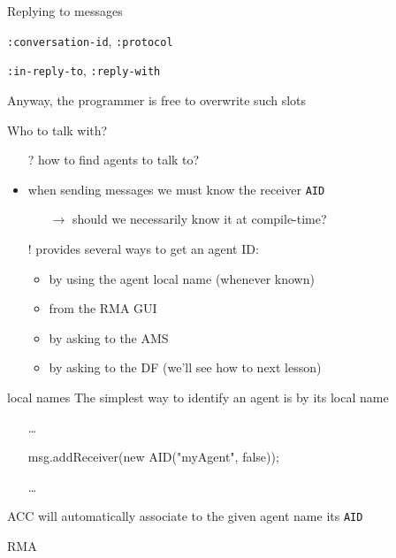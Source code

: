 \documentclass{beamer}\mode<presentation>{\usetheme{AMSCesenaPurpleAndGold}}
\begin{document}
\begin{frame}[c,allowframebreaks]
\begin{block}{Replying to messages}
\begin{itemize}
\begin{small}
                \item \texttt{:conversation-id}, \texttt{:protocol}
                \item \texttt{:in-reply-to}, \texttt{:reply-with}
        \end{small}\end{itemize}
        Anyway, the programmer is free to overwrite such slots
    \end{block}
    \begin{block}{Who to talk with?}
        \begin{itemize}
            \item[?] how to find agents to talk to?
            \item when sending messages we must know the receiver \texttt{AID}
            \begin{itemize}
                \item[$\rightarrow$] should we necessarily know it at compile-time?
            \end{itemize}
            \item[!] \jade{} provides several ways to get an agent ID:
            \begin{itemize}
                \item by using the agent \alert{local name} (whenever known)
                \item from the RMA GUI
                \item by asking to the AMS
                \item by asking to the DF (we'll see how to next lesson)
            \end{itemize}
        \end{itemize}
    \end{block}
    \begin{block}{\jade{} local names}
        The simplest way to identify an agent is by its local name
        \begin{itemize}\tt
            \item[]\ldots
            \item[] msg.addReceiver(new AID("myAgent", \alert{false}));
            \item[] \ldots
        \end{itemize}
        \jade{} ACC will automatically associate to the given agent name its \texttt{AID}
    \end{block}
    \begin{block}{\jade{} RMA}

\end{block}
\end{frame}
\end{document}
